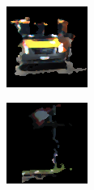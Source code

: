 \begin{frame}
\begin{figure}[h!]
\begin{subfigure}[c]{0.3\textwidth}
            \includegraphics[width=\textwidth]{../Material/texture222_1.png}
        \end{subfigure}
        \begin{subfigure}[c]{0.3\textwidth}
            \includegraphics[width=\textwidth]{../Material/texture0_0.png}
        \end{subfigure}
    \end{figure}
\end{frame}


